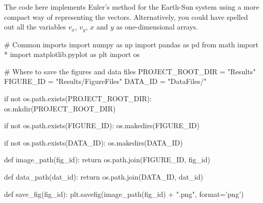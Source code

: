 \documentclass[%
oneside,                 %
final,                   %
10pt]{article}
\begin{document}
The code here implements Euler's method for the Earth-Sun system using a more compact way of representing the vectors. Alternatively, you could have spelled out all the variables $v_x$, $v_y$, $x$ and $y$ as one-dimensional arrays. 


































































\bpycod
# Common imports
import numpy as np
import pandas as pd
from math import *
import matplotlib.pyplot as plt
import os

# Where to save the figures and data files
PROJECT_ROOT_DIR = "Results"
FIGURE_ID = "Results/FigureFiles"
DATA_ID = "DataFiles/"

if not os.path.exists(PROJECT_ROOT_DIR):
    os.mkdir(PROJECT_ROOT_DIR)

if not os.path.exists(FIGURE_ID):
    os.makedirs(FIGURE_ID)

if not os.path.exists(DATA_ID):
    os.makedirs(DATA_ID)

def image_path(fig_id):
    return os.path.join(FIGURE_ID, fig_id)

def data_path(dat_id):
    return os.path.join(DATA_ID, dat_id)

def save_fig(fig_id):
    plt.savefig(image_path(fig_id) + ".png", format='png')
\end{document}

